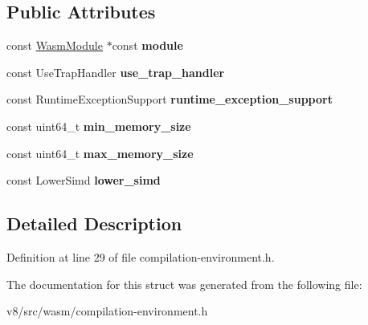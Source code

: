 \subsection*{Public Attributes}
\begin{DoxyCompactItemize}
\item 
\mbox{\label{structv8_1_1internal_1_1wasm_1_1CompilationEnv_aaa94c1bc8d30640716c3e0b5f32097cd}} 
const \mbox{\hyperlink{structv8_1_1internal_1_1wasm_1_1WasmModule}{Wasm\+Module}} $\ast$const {\bfseries module}
\item 
\mbox{\label{structv8_1_1internal_1_1wasm_1_1CompilationEnv_a9dea373e8784007e413d9f1c34cc750b}} 
const Use\+Trap\+Handler {\bfseries use\+\_\+trap\+\_\+handler}
\item 
\mbox{\label{structv8_1_1internal_1_1wasm_1_1CompilationEnv_a727f83070055e20480809f0b327b36d8}} 
const Runtime\+Exception\+Support {\bfseries runtime\+\_\+exception\+\_\+support}
\item 
\mbox{\label{structv8_1_1internal_1_1wasm_1_1CompilationEnv_a16888a24ea170766cf3b8abaa8033511}} 
const uint64\+\_\+t {\bfseries min\+\_\+memory\+\_\+size}
\item 
\mbox{\label{structv8_1_1internal_1_1wasm_1_1CompilationEnv_af41ef1c918dd9fc34048960e51be8da6}} 
const uint64\+\_\+t {\bfseries max\+\_\+memory\+\_\+size}
\item 
\mbox{\label{structv8_1_1internal_1_1wasm_1_1CompilationEnv_a0c940461c258eea77291cc0223a7f132}} 
const Lower\+Simd {\bfseries lower\+\_\+simd}
\end{DoxyCompactItemize}


\subsection{Detailed Description}


Definition at line 29 of file compilation-\/environment.\+h.



The documentation for this struct was generated from the following file\+:\begin{DoxyCompactItemize}
\item 
v8/src/wasm/compilation-\/environment.\+h\end{DoxyCompactItemize}
